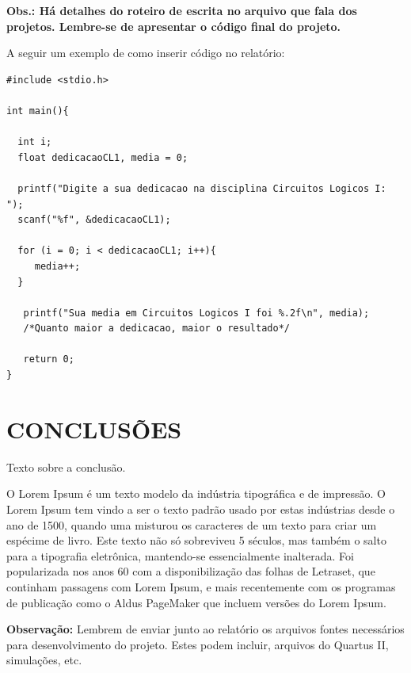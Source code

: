 \documentclass[10pt, a4paper, twocolumn]{article}
\begin{document}
\textbf{Obs.: Há detalhes do roteiro de escrita no arquivo que fala dos projetos. Lembre-se de apresentar o código final do projeto.}

A seguir um exemplo de como inserir código no relatório: \\

\pagestyle{empty}
\begin{lstlisting}
#include <stdio.h>

int main(){
 
  int i;
  float dedicacaoCL1, media = 0;
  
  printf("Digite a sua dedicacao na disciplina Circuitos Logicos I: ");
  scanf("%f", &dedicacaoCL1);
  
  for (i = 0; i < dedicacaoCL1; i++){
     media++;
  }
   
   printf("Sua media em Circuitos Logicos I foi %.2f\n", media);
   /*Quanto maior a dedicacao, maior o resultado*/
   
   return 0;
}
\end{lstlisting}

\section*{CONCLUSÕES}

Texto sobre a conclusão. \par

O Lorem Ipsum é um texto modelo da indústria tipográfica e de impressão. O Lorem Ipsum tem vindo a ser o texto padrão usado por estas indústrias desde o ano de 1500, quando uma misturou os caracteres de um texto para criar um espécime de livro. Este texto não só sobreviveu 5 séculos, mas também o salto para a tipografia eletrônica, mantendo-se essencialmente inalterada. Foi popularizada nos anos 60 com a disponibilização das folhas de Letraset, que continham passagens com Lorem Ipsum, e mais recentemente com os programas de publicação como o Aldus PageMaker que incluem versões do Lorem Ipsum.

\textbf{Observação:} Lembrem de enviar junto ao relatório os arquivos fontes necessários para desenvolvimento do projeto. Estes podem incluir, arquivos do Quartus II, simulações, etc. 

\printbibliography[title={REFERÊNCIAS}]
\end{document}
